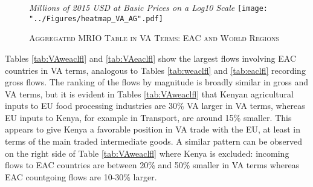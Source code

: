 \documentclass[a4paper]{article}
\begin{document}
\begin{figure}[h!]
\centering
\caption{\label{fig:VAwld}\textsc{Aggregated MRIO Table in VA Terms: EAC and World Regions}}
\small{\textit{Millions of 2015 USD at Basic Prices on a Log10 Scale}}
\texttt{[image: "../Figures/heatmap\_VA\_AG".pdf]} %
\end{figure}
\FloatBarrier

Tables \ref{tab:VAweaclfl} and \ref{tab:VAeaclfl} show the largest flows involving EAC countries in VA terms, analogous to Tables \ref{tab:weaclfl} and \ref{tab:eaclfl} recording gross flows. The ranking of the flows by magnitude is broadly similar in gross and VA terms, but it is evident in Tables \ref{tab:VAweaclfl} that Kenyan agricultural inputs to EU food processing industries are 30\% VA larger in VA terms, whereas EU inputs to Kenya, for example in Transport, are around 15\% smaller. This appears to give Kenya a favorable position in VA trade with the EU, at least in terms of the main traded intermediate goods. A similar pattern can be observed on the right side of Table \ref{tab:VAweaclfl} where Kenya is excluded: incoming flows to EAC countries are between 20\% and 50\% smaller in VA terms whereas EAC countgoing flows are 10-30\% larger.  
\end{document}
